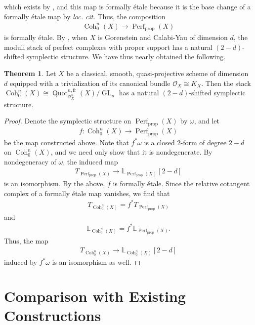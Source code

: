 \documentclass{article}
\numberwithin{equation}{section}
\theoremstyle{quest}
\theoremstyle{definition}
\newtheorem{thm}{Theorem}[section]
\theoremstyle{remark}
\DeclareMathOperator{\GL}{GL}
\DeclareMathOperator{\Coh}{Coh}
\DeclareMathOperator{\Quot}{Quot}
\DeclareMathOperator{\Perf}{Perf}
\begin{document}
which exists by \cite[Corollary 2.19]{PS}, and this map is formally \'etale because it is the base change of a formally \'etale map by \textit{loc. cit.} Thus, the composition
\begin{align*}
	\Coh^n_0(X)\to \Perf_{\text{prop}}(X)
\end{align*} 
is formally \'etale. By \cite{BD}, when $X$ is Gorenstein and Calabi-Yau of dimension $d$, the moduli stack of perfect complexes with proper support has a natural $(2-d)$-shifted symplectic structure. We have thus nearly obtained the following.
\begin{thm}\label{thm:symplectic-structure}
	Let $X$ be a classical, smooth, quasi-projective scheme of dimension $d$ equipped with a trivialization of its canonical bundle $\mathscr{O}_X\cong K_X$. Then the stack $\Coh^n_0(X) \cong \Quot^{n,\text{fr}}_{\mathscr{O}_X^n}(X) /\GL_n$ has a natural $(2-d)$-shifted symplectic structure.
\end{thm} 
\begin{proof}
	Denote the symplectic structure on $\Perf_{\text{prop}}(X)$ by $\omega$, and let
	\begin{align*}
	f:	\Coh^n_0(X)\to \Perf_{\text{prop}}(X)
	\end{align*} 
	be the map constructed above. Note that $f^*\omega$ is a closed 2-form of degree $2-d$ on $\Coh^n_0(X)$, and we need only show that it is nondegenerate. By nondegeneracy of $\omega$, the induced map
	\begin{align*}
		T_{\Perf_{\text{prop}}(X)}\to \mathbb{L}_{\Perf_{\text{prop}}(X)}[2-d]	
	\end{align*} 
	is an isomorphism. By the above, $f$ is formally \'etale. Since the relative cotangent complex of a formally \'etale map vanishes, we find that
	\begin{align*}
		T_{\Coh^n_0(X)}=f^*T_{\Perf_{\text{prop}}(X)}
	\end{align*} 
	and
	\begin{align*}
		\mathbb{L}_{\Coh^n_0(X)}=f^*\mathbb{L}_{\Perf_{\text{prop}}(X)}.
	\end{align*} 
Thus, the map
\begin{align*}
	T_{\Coh^n_0(X)}\to \mathbb{L}_{\Coh^n_0(X)}[2-d]
\end{align*} 
induced by $f^*\omega$ is an isomorphism as well.
\end{proof} 

\appendix
\section{Comparison with Existing Constructions}
\end{document}
